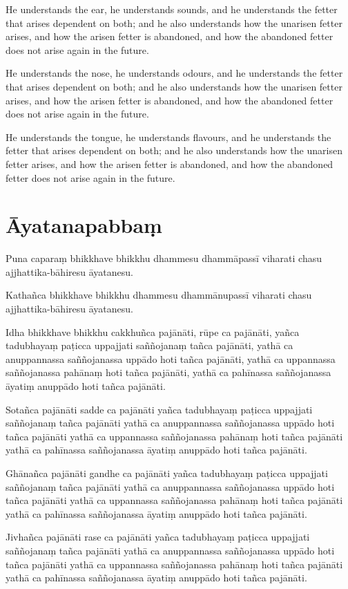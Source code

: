 He understands the ear, he understands sounds, and he understands the fetter
that arises dependent on both; and he also understands how the unarisen fetter
arises, and how the arisen fetter is abandoned, and how the abandoned fetter
does not arise again in the future.

He understands the nose, he understands odours, and he understands the fetter
that arises dependent on both; and he also understands how the unarisen fetter
arises, and how the arisen fetter is abandoned, and how the abandoned fetter
does not arise again in the future.

He understands the tongue, he understands flavours, and he understands the
fetter that arises dependent on both; and he also understands how the unarisen
fetter arises, and how the arisen fetter is abandoned, and how the abandoned
fetter does not arise again in the future.

\paliPage
\section*{Āyatanapabbaṃ}

Puna caparaṃ bhikkhave bhikkhu dhammesu dhammāpassī viharati chasu
ajjhattika-bāhiresu āyatanesu.

Kathañca bhikkhave bhikkhu dhammesu dhammānupassī viharati chasu
ajjhattika-bāhiresu āyatanesu.

Idha bhikkhave bhikkhu
cakkhuñca pajānāti,
rūpe ca pajānāti,
yañca tadubhayaṃ paṭicca uppajjati saññojanaṃ tañca pajānāti,
yathā ca anuppannassa saññojanassa uppādo hoti tañca pajānāti,
yathā ca uppannassa saññojanassa pahānaṃ hoti tañca pajānāti,
yathā ca pahīnassa saññojanassa āyatiṃ anuppādo hoti tañca pajānāti.

Sotañca pajānāti sadde ca pajānāti yañca tadubhayaṃ paṭicca uppajjati saññojanaṃ
tañca pajānāti yathā ca anuppannassa saññojanassa uppādo hoti tañca pajānāti
yathā ca uppannassa saññojanassa pahānaṃ hoti tañca pajānāti yathā ca pahīnassa
saññojanassa āyatiṃ anuppādo hoti tañca pajānāti.

Ghānañca pajānāti gandhe ca pajānāti yañca tadubhayaṃ paṭicca uppajjati
saññojanaṃ tañca pajānāti yathā ca anuppannassa saññojanassa uppādo hoti tañca
pajānāti yathā ca uppannassa saññojanassa pahānaṃ hoti tañca pajānāti yathā ca
pahīnassa saññojanassa āyatiṃ anuppādo hoti tañca pajānāti.

Jivhañca pajānāti rase ca pajānāti yañca tadubhayaṃ paṭicca uppajjati saññojanaṃ
tañca pajānāti yathā ca anuppannassa saññojanassa uppādo hoti tañca pajānāti
yathā ca uppannassa saññojanassa pahānaṃ hoti tañca pajānāti yathā ca pahīnassa
saññojanassa āyatiṃ anuppādo hoti tañca pajānāti.

